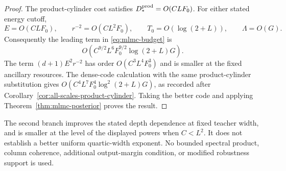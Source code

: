 \begin{proof}
The product-cylinder cost satisfies $D_*^{\rm prod}=O(CLF_0)$.
For either stated energy cutoff,
\[
 E=O(CLF_0),\qquad r^{-2}=O(CL^2F_0),\qquad
 T_0=O(\log(2+L)),\qquad \Lambda=O(G).
\]
Consequently the leading term in \eqref{eq:mlmc-budget} is
\[
 O\!\left(C^{9/2}L^6F_0^{9/2}\log(2+L)G\right).
\]
The term $(d+1)E^2r^{-2}$ has order $O(C^3L^4F_0^3)$ and is smaller
at the fixed ancillary resources. The dense-code calculation with the
same product-cylinder substitution gives
$O(C^4L^7F_0^4\log^2(2+L)G)$, as recorded after
Corollary~\ref{cor:all-scales-product-cylinder}. Taking the better code
and applying Theorem~\ref{thm:mlmc-posterior} proves the result.
\end{proof}

The second branch improves the stated depth dependence at fixed teacher
width, and is smaller at the level of the displayed powers when
$C<L^2$. It does not establish a better uniform quartic-width exponent.
No bounded spectral product, column coherence, additional output-margin
condition, or modified robustness support is used.

